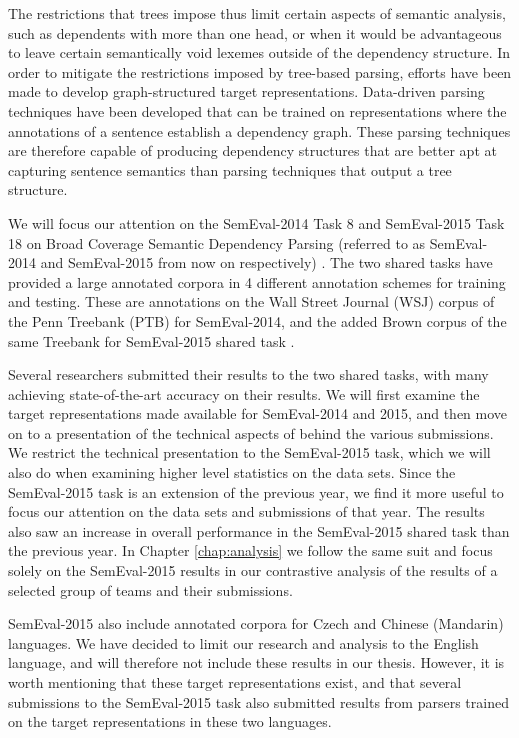 The restrictions that trees impose thus limit certain aspects of semantic analysis, such as dependents with more than one head, or when it would be advantageous to leave certain semantically void lexemes outside of the dependency structure. In order to mitigate the restrictions imposed by tree-based parsing, efforts have been made to develop graph-structured target representations. Data-driven parsing techniques have been developed that can be trained on representations where the annotations of a sentence establish a dependency graph. These parsing techniques are therefore capable of producing dependency structures that are better apt at capturing sentence semantics than parsing techniques that output a tree structure.

We will focus our attention on the SemEval-2014 Task 8 and SemEval-2015 Task 18 on Broad Coverage Semantic Dependency Parsing (referred to as SemEval-2014 and SemEval-2015 from now on respectively) \cite{Oepen:14, Oepen:15}. The two shared tasks have provided a large annotated corpora in 4 different annotation schemes for training and testing. These are annotations on the Wall Street Journal (WSJ) corpus of the Penn Treebank (PTB) for SemEval-2014, and the added Brown corpus of the same Treebank for SemEval-2015 shared task \cite{Mar:San:Mar:93}.

Several researchers submitted their results to the two shared tasks, with many achieving state-of-the-art accuracy on their results. We will first examine the target representations made available for SemEval-2014 and 2015, and then move on to a presentation of the technical aspects of behind the various submissions. We restrict the technical presentation to the SemEval-2015 task, which we will also do when examining higher level statistics on the data sets. Since the SemEval-2015 task is an extension of the previous year, we find it more useful to focus our attention on the data sets and submissions of that year. The results also saw an increase in overall performance in the SemEval-2015 shared task than the previous year. In Chapter \ref{chap:analysis} we follow the same suit and focus solely on the SemEval-2015 results in our contrastive analysis of the results of a selected group of teams and their submissions.

SemEval-2015 also include annotated corpora for Czech and Chinese (Mandarin) languages. We have decided to limit our research and analysis to the English language, and will therefore not include these results in our thesis. However, it is worth mentioning that these target representations exist, and that several submissions to the SemEval-2015 task also submitted results from parsers trained on the target representations in these two languages.

